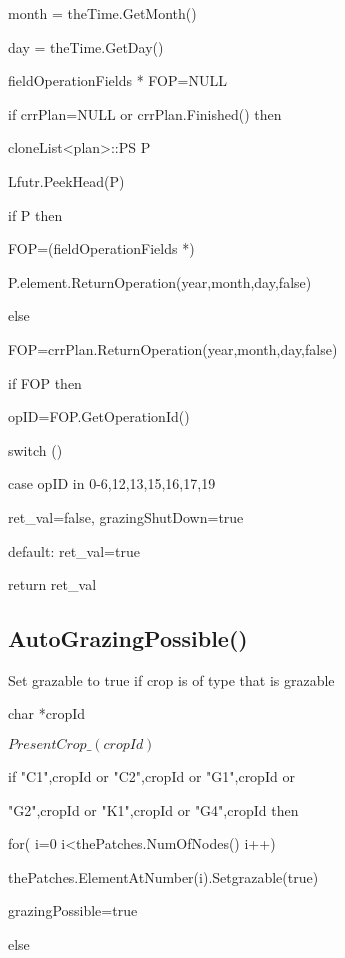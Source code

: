 \documentclass[%
]{scrartcl}
\begin{document}
{{    month = theTime.GetMonth()
    
    day = theTime.GetDay()
    
   fieldOperationFields * FOP=NULL
   
   if crrPlan=NULL  or  crrPlan.Finished() then
   
   \quad    cloneList<plan>::PS P
    
    \quad   Lfutr.PeekHead(P)
  
    \quad   if P then
  
    \quad \quad      FOP=(fieldOperationFields *)
    
     \quad \quad P.element.ReturnOperation(year,month,day,false)
   
   
   else
   
    \quad   FOP=crrPlan.ReturnOperation(year,month,day,false)

   if FOP then
   
    \quad    opID=FOP.GetOperationId()
    
    \quad   switch ()
      
      \quad \quad    case opID in 0-6,12,13,15,16,17,19
        
     \quad \quad \quad        ret\_val=false,
            grazingShutDown=true
    
    \quad \quad      default:         
        ret\_val=true
  
       
   
   
   
	return ret\_val




\subsection{AutoGrazingPossible()}
Set grazable to true if crop is of type that is grazable

   char *cropId

  $ PresentCrop\_(cropId)$
   
   if "C1",cropId  or  "C2",cropId or "G1",cropId  or
   
      "G2",cropId  or  "K1",cropId  or  "G4",cropId then
      
  \quad	   for( i=0 i<thePatches.NumOfNodes() i++)
		
 \quad	 \quad			   thePatches.ElementAtNumber(i).Setgrazable(true)
   
    \quad	 \quad	      grazingPossible=true
      
   else
   
}}
\end{document}
